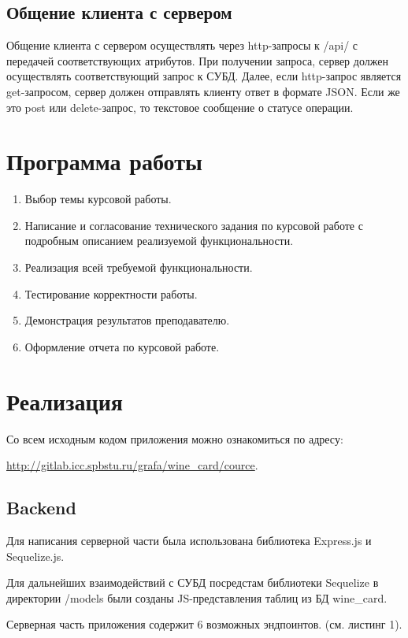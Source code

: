 \subsection{Общение клиента с сервером}
Общение клиента с сервером осуществлять через http-запросы к /api/ с передачей соответствующих атрибутов.
При получении запроса, сервер должен осуществлять соответствующий запрос к СУБД. Далее, если http-запрос является get-запросом, сервер должен отправлять клиенту ответ в формате JSON. Если же это post или delete-запрос, то текстовое сообщение о статусе операции.

\newpage
\section{Программа работы}
\begin{enumerate}
	\item Выбор темы курсовой работы.
	\item Написание и согласование технического задания по курсовой работе с подробным описанием реализуемой функциональности.
	\item Реализация всей требуемой функциональности.
	\item Тестирование корректности работы.
	\item Демонстрация результатов преподавателю.
	\item Оформление отчета по курсовой работе.
\end{enumerate}

\section{Реализация}
Со всем исходным кодом приложения можно ознакомиться по адресу:

\href{http://gitlab.icc.spbstu.ru/grafa/wine_card/cource}{http://gitlab.icc.spbstu.ru/grafa/wine\_card/cource}.
\subsection{Backend}
Для написания серверной части была использована библиотека Express.js и Sequelize.js.

Для дальнейших взаимодействий с СУБД посредстам библиотеки Sequelize в директории /models были созданы JS-представления таблиц из БД wine\_card.

Серверная часть приложения содержит 6 возможных эндпоинтов. (см. листинг 1).

